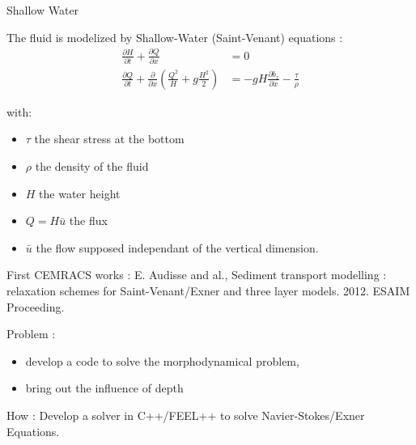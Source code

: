 \begin{frame}{Shallow Water}
  \begin{block}{The fluid is modelized by Shallow-Water (Saint-Venant) equations :}
    \begin{align*}
      \frac{\partial H}{\partial t}+\frac{\partial Q}{\partial x} &= 0 \\
      \frac{\partial Q}{\partial t} +\frac{\partial}{\partial x}\left(  \frac{Q^2}{H} + g\frac{H^2}{2}\right) &= -gH\frac{\partial b_z} {\partial x} - \frac{\tau}{\rho}
    \end{align*}
  \end{block}
  with:
  \begin{itemize}
  \item
    $\tau$ the shear stress at the bottom
  \item
    $\rho$ the density of the fluid
  \item
    $H$ the water height
  \item
    $Q=H\bar{u}$ the flux
  \item
    $\bar{u}$ the flow supposed independant of the vertical dimension.
  \end{itemize}
\end{frame}

\begin{frame}
\begin{block}{First CEMRACS works :}
E. Audisse and al., Sediment transport modelling : relaxation schemes for Saint-Venant/Exner and three layer models. 2012. ESAIM Proceeding.
\end{block}

\begin{alertblock}{Problem :}
\begin{itemize}
\item develop a code to solve the morphodynamical problem,
\item bring out the influence of depth
\end{itemize}
\end{alertblock}

\begin{exampleblock}{How :}
Develop a solver in C++/FEEL++ to solve Navier-Stokes/Exner Equations.
\end{exampleblock}
\end{frame}
